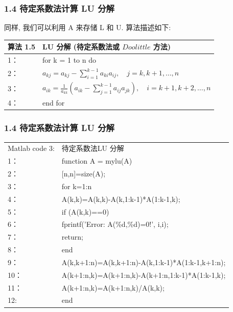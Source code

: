 \documentclass[notheorems,serif]{beamer}
\begin{document}
\begin{frame}
\frametitle{1.4 \quad 待定系数法计算 LU 分解}
同样, 我们可以利用 A 来存储 L 和 U. 算法描述如下:
\begin{table}  
	\begin{tabular*}{16cm}{ll}  
		\hline  
		算法 1.5 &LU 分解 (待定系数法或 $Doolittle$ 方法)\\  
		\hline  
		1：   & for k = 1 to n do\\  
		2：   & \qquad $a_{k j}=a_{k j}-\sum_{i=1}^{k-1} a_{k i} a_{i j}, \quad j=k, k+1, \ldots, n$\\
		3：   & \qquad $a_{i k}=\frac{1}{a_{k k}}\left(a_{i k}-\sum_{j=1}^{k-1} a_{i j} a_{j k}\right), \quad i=k+1, k+2, \ldots, n$\\
		4：   & end for\\
		\hline  
	\end{tabular*}  
\end{table} 
\end{frame}

\begin{frame}
\frametitle{1.4 \quad 待定系数法计算 LU 分解}
\begin{table}  
	\begin{tabular*}{16cm}{ll}  
		\hline  
		Matlab code 3: & 待定系数法LU 分解 \\    
		1：   &function A = mylu(A)\\ 
		2：   &[n,n]=size(A);\\
		3：   &for k=1:n\\
		4：   &\qquad A(k,k)=A(k,k)-A(k,1:k-1)*A(1:k-1,k);\\
		5：   &\qquad if (A(k,k)==0)\\
		6：   &\qquad \qquad fprintf('Error: A(\%d,\%d)=0!', i,i);\\
		7：   &\qquad \qquad return;\\
		8：   &\qquad end\\
		9：   &\qquad A(k,k+1:n)=A(k,k+1:n)-A(k,1:k-1)*A(1:k-1,k+1:n);\\
		10：   &\qquad A(k+1:n,k)=A(k+1:n,k)-A(k+1:n,1:k-1)*A(1:k-1,k);\\
		11：   &\qquad A(k+1:n,k)=A(k+1:n,k)/A(k,k);\\
		12:   &end  \\
		\hline  
	\end{tabular*}  
\end{table}
\end{frame}
\end{document}
